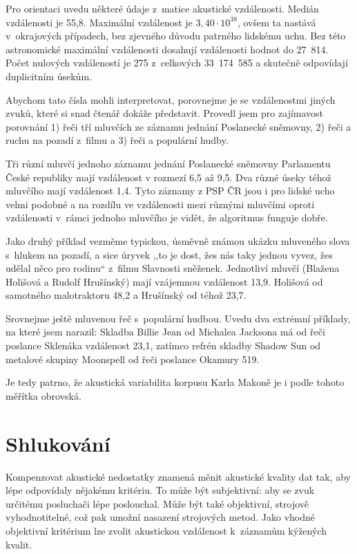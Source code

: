 Pro orientaci uvedu některé údaje z~matice akustické vzdálenosti. 
Medián vzdálenosti je 55,8.
Maximální vzdálenost je $3,40\cdot{}10^{38}$, ovšem ta nastává v~okrajových
případech, bez zjevného důvodu patrného lidskému uchu. Bez této astronomické
maximální vzdálenosti dosahují vzdálenosti hodnot do 27~814.
Počet nulových vzdáleností je 275 z~celkových 33~174~585 a skutečně odpovídají
duplicitním úsekům.

Abychom tato čísla mohli interpretovat, porovnejme je se vzdálenostmi jiných
zvuků, které si snad čtenář dokáže představit.
Provedl jsem pro zajímavost porovnání 1) řeči tří mluvčích ze záznamu jednání
Poslanecké sněmovny, 2) řeči a ruchu na pozadí z~filmu a 3) řeči a populární hudby.

Tři různí mluvčí jednoho záznamu jednání Poslanecké sněmovny
Parlamentu České republiky mají vzdálenost v rozmezí 6,5 až 9,5. Dva různé úseky
téhož mluvčího mají vzdálenost 1,4. Tyto záznamy z PSP ČR jsou i pro lidské ucho
velmi podobné a na rozdílu ve vzdálenosti mezi různými mluvčími oproti
vzdálenosti v~rámci jednoho mluvčího je vidět, že algoritmus funguje dobře.

Jako druhý příklad vezměme typickou, úsměvně známou ukázku mluveného slova
s~hlukem na pozadí, a sice úryvek ,,to je dost, žes nás taky jednou vyvez, žes
udělal něco pro rodinu`` z~filmu Slavnosti sněženek. Jednotliví mluvčí (Blažena
Holišová a Rudolf Hrušínský) mají vzájemnou vzdálenost 13,9. Holišová od
samotného malotraktoru 48,2 a Hrušínský od téhož 23,7.

Srovnejme ještě mluvenou řeč s~populární hudbou. Uvedu dva extrémní příklady, na
které jsem narazil:
Skladba Billie Jean od Michalea Jacksona má od řeči poslance Sklenáka vzdálenost
23,1, zatímco refrén skladby Shadow Sun od metalové skupiny Moonspell od řeči
poslance Okamury 519.

Je tedy patrno, že akustická variabilita korpusu Karla Makoně je i podle tohoto
měřítka obrovská.

\section{Shlukování}

Kompenzovat akustické nedostatky znamená měnit akustické kvality dat tak, aby
lépe odpovídaly nějakému kritériu. To může být subjektivní: aby se zvuk určitému
posluchači lépe poslouchal. Může být také objektivní, strojově vyhodnotitelné,
což pak umožní nasazení strojových metod. Jako vhodné objektivní kritérium lze
zvolit akustickou vzdálenost k~záznamům kýžených kvalit.

